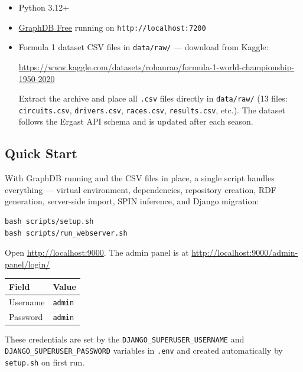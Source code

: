 \documentclass[12pt,a4paper]{article}
\begin{document}
\begin{itemize}[leftmargin=1.5em]
  \item Python 3.12+
  \item \href{https://www.ontotext.com/products/graphdb/download/}{GraphDB Free}
        running on \texttt{http://localhost:7200}
  \item Formula 1 dataset CSV files in \texttt{data/raw/} --- download from Kaggle:
        \begin{center}
          \url{https://www.kaggle.com/datasets/rohanrao/formula-1-world-championship-1950-2020}
        \end{center}
        Extract the archive and place all \texttt{.csv} files directly in
        \texttt{data/raw/} (13 files: \texttt{circuits.csv}, \texttt{drivers.csv},
        \texttt{races.csv}, \texttt{results.csv}, etc.).
        The dataset follows the Ergast API schema and is updated after each season.
\end{itemize}

\subsection{Quick Start}

With GraphDB running and the CSV files in place, a single script handles
everything --- virtual environment, dependencies, repository creation, RDF
generation, server-side import, SPIN inference, and Django migration:

\begin{lstlisting}[style=shell]
bash scripts/setup.sh
bash scripts/run_webserver.sh
\end{lstlisting}

Open \url{http://localhost:9000}. The admin panel is at
\url{http://localhost:9000/admin-panel/login/}

\begin{center}
\begin{tabular}{@{}ll@{}}
\toprule
\textbf{Field} & \textbf{Value} \\
\midrule
Username & \texttt{admin} \\
Password & \texttt{admin} \\
\bottomrule
\end{tabular}
\end{center}

These credentials are set by the \texttt{DJANGO\_SUPERUSER\_USERNAME} and
\texttt{DJANGO\_SUPERUSER\_PASSWORD} variables in \texttt{.env} and created
automatically by \texttt{setup.sh} on first run.
\end{document}
